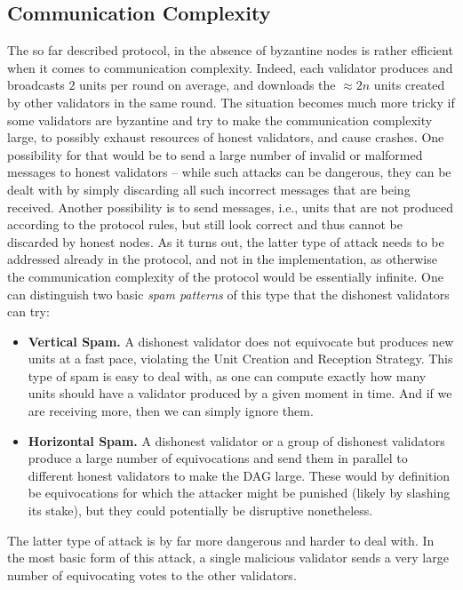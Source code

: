 \documentclass[12pt, fleqn]{article}
\begin{document}

\subsection{Communication Complexity}
The so far described protocol, in the absence of byzantine nodes is rather efficient when it comes to communication complexity.
%
Indeed, each validator produces and broadcasts $2$ units per round on average, and downloads the $\approx 2n$ units created by other validators in the same round.
%
The situation becomes much more tricky if some validators are byzantine and try to make the communication complexity large, to possibly exhaust resources of honest validators, and cause crashes. 
%
One possibility for that would be to send a large number of invalid or malformed messages to honest validators -- while such attacks can be dangerous, they can be dealt with by simply discarding all such incorrect messages that are being received.
%
Another possibility is to send messages, i.e., units that are not produced according to the protocol rules, but still look correct and thus cannot be discarded by honest nodes.
%
As it turns out, the latter type of attack needs to be addressed already in the protocol, and not in the implementation, as otherwise the communication complexity of the protocol would be essentially infinite.
%
One can distinguish two basic {\it spam patterns} of this type that the dishonest validators can try:
\begin{itemize}
    \item {\bf Vertical Spam.} A dishonest validator does not equivocate but produces new units at a fast pace, violating the Unit Creation and Reception Strategy. This type of spam is easy to deal with, as one can compute exactly how many units should have a validator produced by a given moment in time. And if we are receiving more, then we can simply ignore them. 
    \item {\bf Horizontal Spam.} A dishonest validator or a group of dishonest validators produce a large number of equivocations and send them in parallel to different honest validators to make the DAG large. These would by definition be equivocations for which the attacker might be punished (likely by slashing its stake), but they could potentially be disruptive nonetheless.
\end{itemize}
The latter type of attack is by far more dangerous and harder to deal with.
%
In the most basic form of this attack, a single malicious validator sends a very large number of equivocating votes to the other validators.
\end{document}
